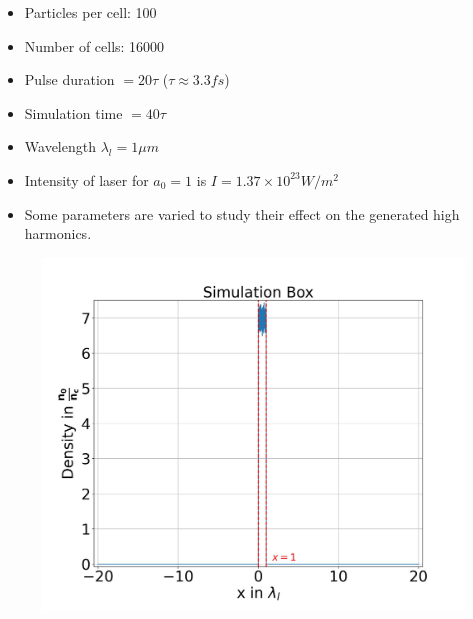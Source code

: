 \documentclass{beamer}
\begin{document}
\begin{frame}
    \begin{minipage}[t]{0.48\linewidth}
        \begin{itemize}
            \item Particles per cell: 100
            \item Number of cells: 16000
            \item Pulse duration $= 20 \tau$ ($\tau\approx 3.3 fs$)
            \item Simulation time $= 40 \tau$
            \item Wavelength $\lambda_l = 1 \mu m$
            \item Intensity of laser for $a_0 = 1$ is $I = 1.37 \times 10^{23} W/m^2$
            \item Some parameters are varied to study their effect on the generated high harmonics.
        \end{itemize}
    \end{minipage}
    \begin{minipage}[t]{0.48\linewidth}
        \begin{figure}
            \centering
            \includegraphics[width=1.0\textwidth, height=0.62\textheight]{images/plasma.jpg}
            \label{fig:plasma}
        \end{figure}
    \end{minipage}


\end{frame}
\end{document}

